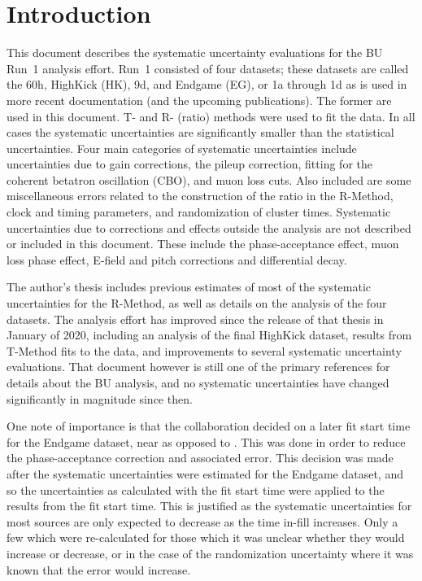 
\graphicspath{}

\section{Introduction}


This document describes the systematic uncertainty evaluations for the BU Run~1 \wa analysis effort. Run~1 consisted of four datasets; these datasets are called the 60h, HighKick (HK), 9d, and Endgame (EG), or 1a through 1d as is used in more recent documentation (and the upcoming publications). The former are used in this document. T- and R- (ratio) methods were used to fit the data. In all cases the systematic uncertainties are significantly smaller than the statistical uncertainties. Four main categories of systematic uncertainties include uncertainties due to gain corrections, the pileup correction, fitting for the coherent betatron oscillation (CBO), and muon loss cuts. Also included are some miscellaneous errors related to the construction of the ratio in the R-Method, clock and timing parameters, and randomization of cluster times. Systematic uncertainties due to corrections and effects outside the \wa analysis are not described or included in this document. These include the phase-acceptance effect, muon loss phase effect, E-field and pitch corrections and differential decay.

The author's thesis \cite{phdthesis:2020Kinnaird} includes previous estimates of most of the systematic uncertainties for the R-Method, as well as details on the analysis of the four datasets. The analysis effort has improved since the release of that thesis in January of 2020, including an analysis of the final HighKick dataset, results from T-Method fits to the data, and improvements to several systematic uncertainty evaluations. That document however is still one of the primary references for details about the BU \wa analysis, and no systematic uncertainties have changed significantly in magnitude since then.

One note of importance is that the collaboration decided on a later fit start time for the Endgame dataset, near  as opposed to . This was done in order to reduce the phase-acceptance correction and associated error. This decision was made after the systematic uncertainties were estimated for the Endgame dataset, and so the uncertainties as calculated with the  fit start time were applied to the results from the  fit start time. This is justified as the systematic uncertainties for most sources are only expected to decrease as the time in-fill increases. Only a few which were re-calculated for those which it was unclear whether they would increase or decrease, or in the case of the randomization uncertainty where it was known that the error would increase.

